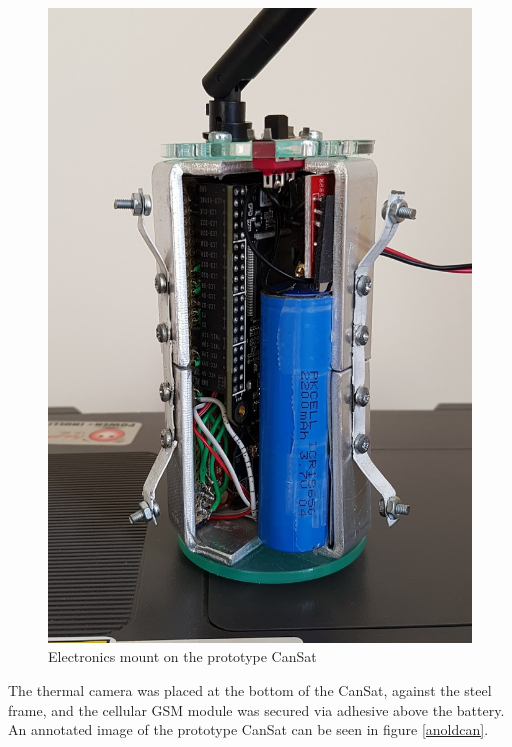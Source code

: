 \documentclass[]{report}
\begin{document}
	 	\begin{figure}[h]
	 		\hfill\includegraphics[scale=0.4]{old_cansat_side.jpg}\hspace*{\fill}
	 		\caption{Electronics mount on the prototype CanSat}
	 		\label{emount}
	 	\end{figure}
	 	
	 	The thermal camera was placed at the bottom of the CanSat, against the steel frame, and the cellular GSM module was secured via adhesive above the battery. An annotated image of the prototype CanSat can be seen in figure \ref{anoldcan}.
	 	
\end{document}
